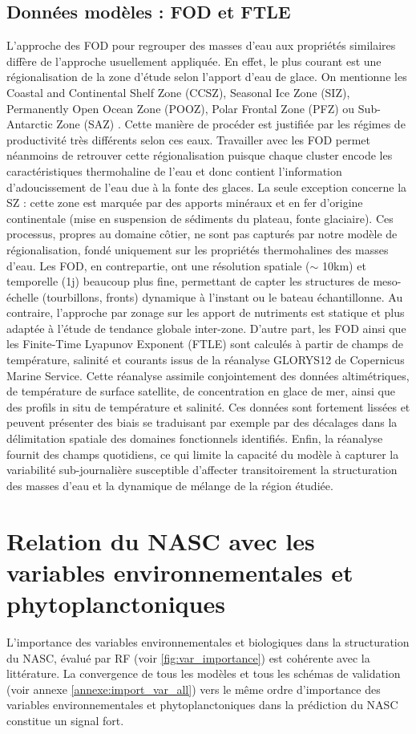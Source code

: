 \documentclass[11pt,a4paper,oneside]{report}
\begin{document}
	\subsection{Données modèles : FOD et FTLE}
	L'approche des FOD pour regrouper des masses d'eau aux propriétés similaires diffère de l'approche usuellement appliquée. En effet, le plus courant est une régionalisation de la zone d'étude selon l'apport d'eau de glace. On mentionne les Coastal and Continental Shelf Zone (CCSZ), Seasonal Ice Zone (SIZ), Permanently Open Ocean Zone (POOZ), Polar Frontal Zone (PFZ) ou Sub-Antarctic Zone (SAZ) \cite{treguer1992}. Cette manière de procéder est justifiée par les régimes de productivité très différents selon ces eaux. Travailler avec les FOD permet néanmoins de retrouver cette régionalisation puisque chaque cluster encode les caractéristiques thermohaline de l'eau et donc contient l'information d'adoucissement de l'eau due à la fonte des glaces. La seule exception concerne la SZ : cette zone est marquée par des apports minéraux et en fer d'origine continentale (mise en suspension de sédiments du plateau, fonte glaciaire). Ces processus, propres au domaine côtier, ne sont pas capturés par notre modèle de régionalisation, fondé uniquement sur les propriétés thermohalines des masses d'eau. Les FOD, en contrepartie, ont une résolution spatiale ($\sim$ 10km) et temporelle (1j) beaucoup plus fine, permettant de capter les structures de meso-échelle (tourbillons, fronts) dynamique à l'instant ou le bateau échantillonne. Au contraire, l'approche par zonage sur les apport de nutriments est statique et plus adaptée à l'étude de tendance globale inter-zone.   
	D'autre part, les FOD ainsi que les Finite-Time Lyapunov Exponent (FTLE) sont calculés à partir de champs de température, salinité et courants issus de la réanalyse GLORYS12 de Copernicus Marine Service. Cette réanalyse assimile conjointement des données altimétriques, de température de surface satellite, de concentration en glace de mer, ainsi que des profils in situ de température et salinité. Ces données sont fortement lissées et peuvent présenter des biais se traduisant par exemple par des décalages dans la délimitation spatiale des domaines fonctionnels identifiés. Enfin, la réanalyse fournit des champs quotidiens, ce qui limite la capacité du modèle à capturer la variabilité sub-journalière susceptible d'affecter transitoirement la structuration des masses d'eau et la dynamique de mélange de la région étudiée.
	
	\section{Relation du NASC avec les variables environnementales et phytoplanctoniques}
	L'importance des variables environnementales et biologiques dans la structuration du NASC, évalué par RF (voir \ref{fig:var_importance}) est cohérente avec la littérature. La convergence de tous les modèles et tous les schémas de validation (voir annexe \ref{annexe:import_var_all}) vers le même ordre d'importance des variables environnementales et phytoplanctoniques dans la prédiction du NASC constitue un signal fort.  
	
\end{document}
